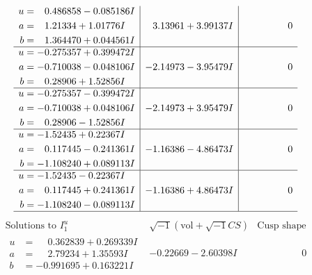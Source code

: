 \documentclass[1p]{elsarticle_modified}
\theoremstyle{definition}
\newcommand{\I}{\sqrt{-1}}
\begin{document}
$$\begin{array}{c|c|c}
\begin{aligned}
u &= \phantom{-}0.486858 - 0.085186 I \\
a &= \phantom{-}1.21334 + 1.01776 I \\
b &= \phantom{-}1.364470 + 0.044561 I\end{aligned}
 & \phantom{-}3.13961 + 3.99137 I & \phantom{-0.000000 } 0 \\ \hline\begin{aligned}
u &= -0.275357 + 0.399472 I \\
a &= -0.710038 - 0.048106 I \\
b &= \phantom{-}0.28906 + 1.52856 I\end{aligned}
 & -2.14973 - 3.95479 I & \phantom{-0.000000 } 0 \\ \hline\begin{aligned}
u &= -0.275357 - 0.399472 I \\
a &= -0.710038 + 0.048106 I \\
b &= \phantom{-}0.28906 - 1.52856 I\end{aligned}
 & -2.14973 + 3.95479 I & \phantom{-0.000000 } 0 \\ \hline\begin{aligned}
u &= -1.52435 + 0.22367 I \\
a &= \phantom{-}0.117445 - 0.241361 I \\
b &= -1.108240 + 0.089113 I\end{aligned}
 & -1.16386 - 4.86473 I & \phantom{-0.000000 } 0 \\ \hline\begin{aligned}
u &= -1.52435 - 0.22367 I \\
a &= \phantom{-}0.117445 + 0.241361 I \\
b &= -1.108240 - 0.089113 I\end{aligned}
 & -1.16386 + 4.86473 I & \phantom{-0.000000 } 0\\
 \hline 
 \end{array}$$\newpage$$\begin{array}{c|c|c}  
\text{Solutions to }I^u_{1}& \I (\text{vol} + \sqrt{-1}CS) & \text{Cusp shape}\\
 \hline 
\begin{aligned}
u &= \phantom{-}0.362839 + 0.269339 I \\
a &= \phantom{-}2.79234 + 1.35593 I \\
b &= -0.991695 + 0.163221 I\end{aligned}
 & -0.22669 - 2.60398 I & \phantom{-0.000000 } 0 \\ \hline\begin{aligned}

\end{aligned}
\end{array}$$
\end{document}
